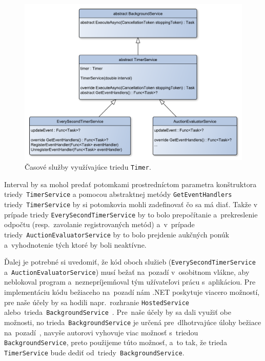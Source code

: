 \begin{figure}[H]\centering
\includegraphics[width=140mm]{../img/timer services uml}
\caption{Časové služby využívajúce triedu \texttt{Timer}.}
\label{timer services uml}
\end{figure}

Interval by sa mohol predať potomkami prostredníctom parametra konštruktora triedy~\verb|TimerService| a pomocou abstraktnej metódy \verb|GetEventHandlers| triedy~\verb|TimerService| by si potomkovia mohli zadefinovať čo sa má diať. Takže v prípade triedy \verb|EverySecondTimerService| by to bolo prepočítanie a~prekreslenie odpočtu (resp.~zavolanie registrovaných metód) a~v~prípade triedy~\verb|AuctionEvaluatorService| by to bolo prejdenie aukčných ponúk a~vyhodnotenie tých ktoré by boli neaktívne.

Ďalej je potrebné si uvedomiť, že kód oboch služieb (\verb|EverySecondTimerService| a~\verb|AuctionEvaluatorService|) musí bežať na~pozadí v~osobitnom vlákne, aby neblokoval program a~neznepríjemňoval tým užívateľovi prácu s~aplikáciou. Pre implementáciu kódu bežiaceho na~pozadí nám .NET poskytuje viacero možností, pre naše účely by sa hodili napr.~rozhranie \texttt{HostedService}~\cite{hosted service} alebo~trieda~\texttt{BackgroundService}~\cite{background service}. Pre~naše účely by sa dali využiť obe možnosti, no trieda~\verb|BackgroundService| je určená pre~dlhotrvajúce úlohy bežiace na~pozadí~\cite{background service for long running tasks}, navyše autorovi vyhovuje viac možnosť s~triedou \verb|BackgroundService|, preto použijeme túto možnosť, a~to tak, že trieda \verb|TimerService| bude dediť od~triedy~\verb|BackgroundService|.

